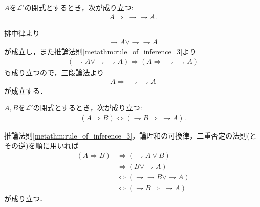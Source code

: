 	\begin{screen}
		\begin{metathm}[二重否定の法則の逆が成り立つ]
			$A$を$\mathcal{L}'$の閉式とするとき，次が成り立つ:
			\begin{align}
				A \Longrightarrow\ \rightharpoondown \rightharpoondown A.
			\end{align}
		\end{metathm}
	\end{screen}
	
	\begin{prf}
		排中律より
		\begin{align}
			\rightharpoondown A \vee \rightharpoondown \rightharpoondown A
		\end{align}
		が成立し，また推論法則\ref{metathm:rule_of_inference_3}より
		\begin{align}
			(\rightharpoondown A \vee \rightharpoondown \rightharpoondown A)
			\Longrightarrow (A \Longrightarrow\ \rightharpoondown \rightharpoondown A)
		\end{align}
		も成り立つので，三段論法より
		\begin{align}
			A \Longrightarrow\ \rightharpoondown \rightharpoondown A
		\end{align}
		が成立する．
		\QED
	\end{prf}
	
	\begin{screen}
		\begin{metathm}[対偶命題は同値]
			$A,B$を$\mathcal{L}'$の閉式とするとき，次が成り立つ:
			\begin{align}
				(A \Longrightarrow B) \Longleftrightarrow (\rightharpoondown B \Longrightarrow\ \rightharpoondown A).
			\end{align}
		\end{metathm}
	\end{screen}
	
	\begin{prf}
		推論法則\ref{metathm:rule_of_inference_3}，論理和の可換律，二重否定の法則(とその逆)を順に用いれば
		\begin{align}
			(A \Longrightarrow B) &\Longleftrightarrow (\rightharpoondown A \vee B) \\
			&\Longleftrightarrow (B \vee \rightharpoondown A) \\
			&\Longleftrightarrow (\rightharpoondown \rightharpoondown B \vee \rightharpoondown A) \\
			&\Longleftrightarrow (\rightharpoondown B \Longrightarrow\ \rightharpoondown A)
		\end{align}
		が成り立つ．
		\QED
	\end{prf}
	
